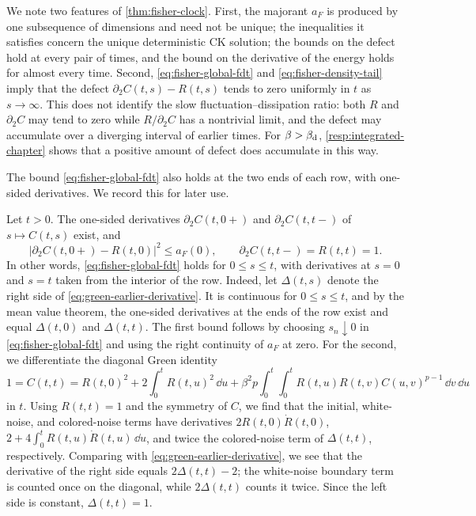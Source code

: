 We note two features of \cref{thm:fisher-clock}. First, the majorant $a_F$ is produced by one subsequence of dimensions and need not be unique; the inequalities it satisfies concern the unique deterministic CK solution; the bounds on the defect hold at every pair of times, and the bound on the derivative of the energy holds for almost every time. Second, \eqref{eq:fisher-global-fdt} and \eqref{eq:fisher-density-tail} imply that the defect $\partial_2C(t,s)-R(t,s)$ tends to zero uniformly in $t$ as $s\to\infty$. This does not identify the slow fluctuation--dissipation ratio: both $R$ and $\partial_2C$ may tend to zero while $R/\partial_2C$ has a nontrivial limit, and the defect may accumulate over a diverging interval of earlier times. For $\beta>\beta_{\mathrm d}$, \cref{resp:integrated-chapter} shows that a positive amount of defect does accumulate in this way.

The bound \eqref{eq:fisher-global-fdt} also holds at the two ends of each row, with one-sided derivatives. We record this for later use.

\begin{remark}\label{rem:fisher-endpoints}
Let $t>0$. The one-sided derivatives $\partial_2C(t,0+)$ and $\partial_2C(t,t-)$ of $s\mapsto C(t,s)$ exist, and
\[
 |\partial_2C(t,0+)-R(t,0)|^2\le a_F(0),
 \qquad
 \partial_2C(t,t-)=R(t,t)=1.
\]
In other words, \eqref{eq:fisher-global-fdt} holds for $0\le s\le t$, with derivatives at $s=0$ and $s=t$ taken from the interior of the row. Indeed, let $\Delta(t,s)$ denote the right side of \eqref{eq:green-earlier-derivative}. It is continuous for $0\le s\le t$, and by the mean value theorem, the one-sided derivatives at the ends of the row exist and equal $\Delta(t,0)$ and $\Delta(t,t)$. The first bound follows by choosing $s_n\downarrow0$ in \eqref{eq:fisher-global-fdt} and using the right continuity of $a_F$ at zero. For the second, we differentiate the diagonal Green identity
\[
 1=C(t,t)=R(t,0)^2+2\int_0^tR(t,u)^2\,\dd u
 +\beta^2p\int_0^t\int_0^tR(t,u)R(t,v)C(u,v)^{p-1}\,\dd v\,\dd u
\]
in $t$. Using $R(t,t)=1$ and the symmetry of $C$, we find that the initial, white-noise, and colored-noise terms have derivatives $2R(t,0)\dot R(t,0)$, $2+4\int_0^tR(t,u)\dot R(t,u)\,\dd u$, and twice the colored-noise term of $\Delta(t,t)$, respectively. Comparing with \eqref{eq:green-earlier-derivative}, we see that the derivative of the right side equals $2\Delta(t,t)-2$; the white-noise boundary term is counted once on the diagonal, while $2\Delta(t,t)$ counts it twice. Since the left side is constant, $\Delta(t,t)=1$.
\end{remark}

